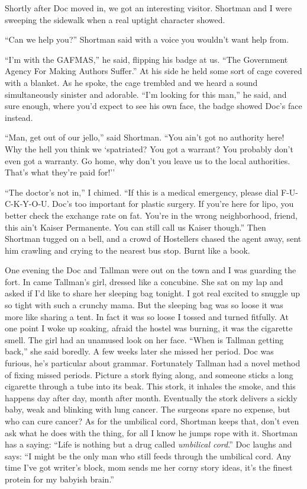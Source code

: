 \documentclass[oneside]{book}
\begin{document}
Shortly after Doc moved in, we got an interesting visitor.  Shortman and I were sweeping the
sidewalk when a real uptight character showed.

``Can we help you?'' Shortman said with a voice you wouldn't want help from.

``I'm with the GAFMAS,'' he said, flipping his badge at us.  ``The Government Agency For
Making Authors Suffer.''  At his side he held some sort of cage covered with a blanket.
As he spoke, the cage trembled and we heard a sound simultaneously sinister
and adorable.  ``I'm looking for this man,'' he said, and sure enough, where you'd expect
to see his own face, the badge showed Doc's face instead.

``Man, get out of our jello,'' said Shortman.  ``You ain't got no authority here!
Why the hell you think we `spatriated?  You got a warrant?  You probably don't even got a warranty.
Go home, why don't you leave us to the local authorities.  That's what they're paid for!''

``The doctor's not in,'' I chimed.  ``If this is a medical emergency, please dial F-U-C-K-Y-O-U.
Doc's too important for plastic surgery.  If you're here for lipo, you better
check the exchange rate on fat.  You're in the wrong neighborhood, friend, this ain't
Kaiser Permanente.  You can still call us Kaiser though.''  Then Shortman tugged on a bell, and
a crowd of Hostellers chased the agent away, sent him crawling and crying to the nearest
bus stop.  Burnt like a book.


One evening the Doc and Tallman were out on the town and I was guarding the fort.
In came Tallman's girl, dressed like a concubine.  She sat on my lap and asked if
I'd like to share her sleeping bag tonight.  I got real excited to
snuggle up so tight with such a crunchy mama.  But the sleeping bag was so loose it was
more like sharing a tent.  In fact it was so loose I tossed and turned fitfully.  At one
point I woke up soaking, afraid the hostel was burning, it was the cigarette smell.
The girl had an unamused look on her face.  ``When is Tallman getting back,'' she said boredly.
A few weeks later she missed her period.  Doc was furious, he's
particular about grammar.  Fortunately Tallman had a novel method of fixing missed
periods.  Picture a stork flying along, and someone sticks a long cigarette through a tube
into its beak.  This stork, it inhales the smoke, and this happens day after day, month
after month.  Eventually the stork delivers a sickly baby, weak and blinking with lung
cancer.  The surgeons spare no expense, but who can cure cancer?  As for the
umbilical cord, Shortman keeps that, don't even ask what he does with the thing,
for all I know he jumps rope with it.
Shortman has a saying:  ``Life is nothing but a drug called \emph{umbilical
cord}.''  Doc laughs and says:  ``I might be the only man who still feeds through the
umbilical cord.  Any time I've got writer's block, mom sends me her corny story ideas, it's
the finest protein for my babyish brain.''
\end{document}
